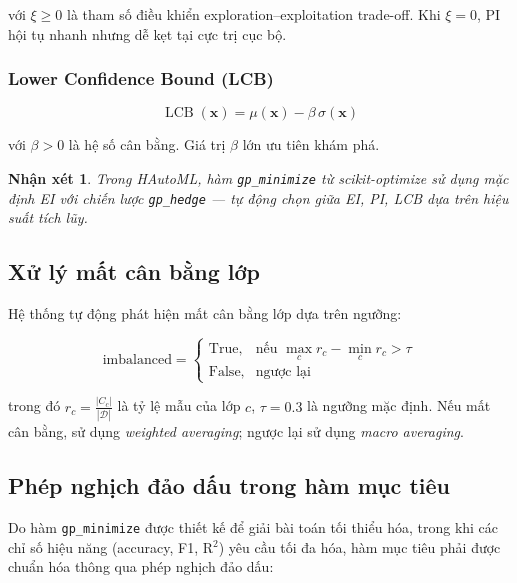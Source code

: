 \documentclass[12pt,a4paper]{article}
\newtheorem{remark}{Nhận xét}[section]
\DeclareMathOperator{\LCB}{LCB}
\begin{document}
\noindent với $\xi \geq 0$ là tham số điều khiển exploration--exploitation trade-off.
Khi $\xi = 0$, PI hội tụ nhanh nhưng dễ kẹt tại cực trị cục bộ.

\subsubsection{Lower Confidence Bound (LCB)}

\begin{equation}
    \LCB(\mathbf{x}) = \mu(\mathbf{x}) - \beta\,\sigma(\mathbf{x})
    \label{eq:lcb}
\end{equation}

\noindent với $\beta > 0$ là hệ số cân bằng. Giá trị $\beta$ lớn ưu tiên khám phá.

\begin{remark}
Trong HAutoML, hàm \texttt{gp\_minimize} từ scikit-optimize sử dụng mặc định
EI với chiến lược \texttt{gp\_hedge} --- tự động chọn giữa EI, PI, LCB dựa trên
hiệu suất tích lũy.
\end{remark}

\subsection{Xử lý mất cân bằng lớp}

Hệ thống tự động phát hiện mất cân bằng lớp dựa trên ngưỡng:

\begin{equation}
    \text{imbalanced} =
    \begin{cases}
        \text{True}, & \text{nếu } \max_c r_c - \min_c r_c > \tau \\
        \text{False}, & \text{ngược lại}
    \end{cases}
    \label{eq:imbalance_detection}
\end{equation}

\noindent trong đó $r_c = \frac{|C_c|}{|\mathcal{D}|}$ là tỷ lệ mẫu của lớp $c$,
$\tau = 0.3$ là ngưỡng mặc định. Nếu mất cân bằng, sử dụng
\textit{weighted averaging}; ngược lại sử dụng \textit{macro averaging}.

\subsection{Phép nghịch đảo dấu trong hàm mục tiêu}

Do hàm \texttt{gp\_minimize} được thiết kế để giải bài toán tối thiểu hóa,
trong khi các chỉ số hiệu năng (accuracy, F1, R$^2$) yêu cầu tối đa hóa, hàm
mục tiêu phải được chuẩn hóa thông qua phép nghịch đảo dấu:
\end{document}
